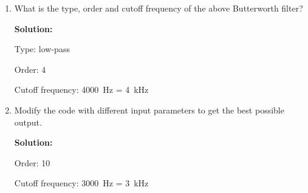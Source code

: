 \documentclass[journal,12pt,twocolumn]{IEEEtran}
\newcommand{\solution}{\noindent \textbf{Solution: }}
\numberwithin{equation}{section}
\renewcommand\thesection{\arabic{section}}
\begin{document}
\begin{enumerate}[label=\thesection.\arabic*]
	\item What is the type, order and cutoff frequency of the above Butterworth filter?
	
	\solution 
	
	Type: low-pass
	
	Order: 4
	
	Cutoff frequency: \SI{4000}{\hertz} = \SI{4}{\kilo\hertz}
	
	\item Modify the code with different input parameters to get the best possible output.
	
	\solution
	
	Order: 10
	
	Cutoff frequency: \SI{3000}{\hertz} = \SI{3}{\kilo\hertz}
	
	\end{enumerate}
\end{document}
